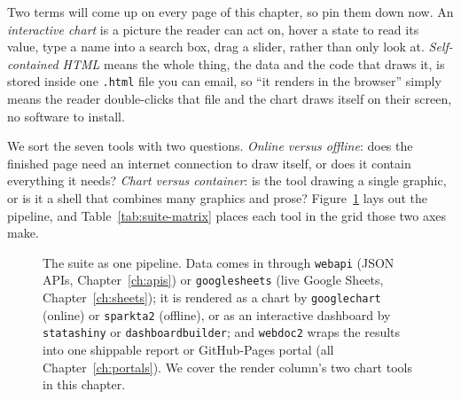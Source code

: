 Two terms will come up on every page of this chapter, so pin them down now. An \emph{interactive chart} is a picture the reader can act on, hover a state to read its value, type a name into a search box, drag a slider, rather than only look at. \emph{Self-contained HTML} means the whole thing, the data and the code that draws it, is stored inside one \texttt{.html} file you can email, so \enquote{it renders in the browser} simply means the reader double-clicks that file and the chart draws itself on their screen, no software to install.

We sort the seven tools with two questions. \emph{Online versus offline}: does the finished page need an internet connection to draw itself, or does it contain everything it needs? \emph{Chart versus container}: is the tool drawing a single graphic, or is it a shell that combines many graphics and prose? Figure~\ref{fig:suite-pipeline} lays out the pipeline, and Table~\ref{tab:suite-matrix} places each tool in the grid those two axes make.

\begin{figure}[htbp]
\centering
{}
\caption[The visualization suite pipeline]{The suite as one pipeline. Data comes in through \texttt{webapi} (JSON APIs, Chapter~\ref{ch:apis}) or \texttt{googlesheets} (live Google Sheets, Chapter~\ref{ch:sheets}); it is rendered as a chart by \texttt{googlechart} (online) or \texttt{sparkta2} (offline), or as an interactive dashboard by \texttt{statashiny} or \texttt{dashboardbuilder}; and \texttt{webdoc2} wraps the results into one shippable report or GitHub-Pages portal (all Chapter~\ref{ch:portals}). We cover the render column's two chart tools in this chapter.}
\label{fig:suite-pipeline}
\end{figure}

